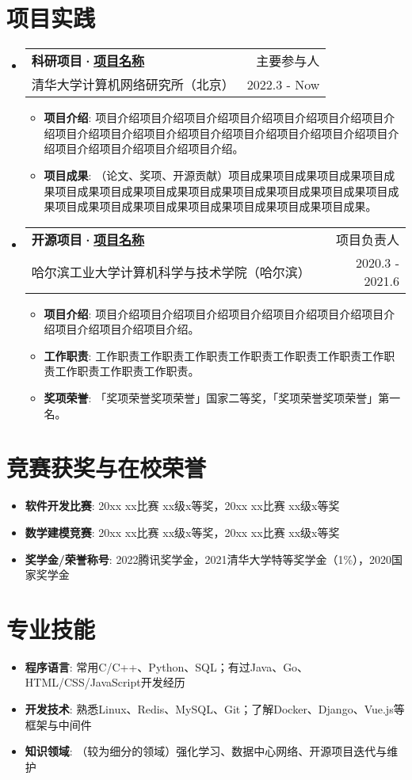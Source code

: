 \documentclass[letterpaper,11pt]{article}
\makeatletter
\newcommand{\resumeItem}[2]{
  \item\small{
    \textbf{#1}{: #2 \vspace{-2pt}}
  }
}
\newcommand{\resumeSubheading}[4]{
  \vspace{-1pt}\item
    \begin{tabular*}{0.97\textwidth}[t]{l@{\extracolsep{\fill}}r}
      \textbf{#1} & #2 \\
      {\small#3} & {\small #4} \\
    \end{tabular*}\vspace{-5pt}
}
\newcommand{\resumeSubItem}[2]{\resumeItem{#1}{#2}\vspace{-4pt}}
\newcommand{\resumeSubHeadingListStart}{\begin{itemize}[leftmargin=*]}
\newcommand{\resumeSubHeadingListEnd}{\end{itemize}}
\newcommand{\resumeItemListStart}{\begin{itemize}}
\newcommand{\resumeItemListEnd}{\end{itemize}\vspace{-5pt}}
\makeatother
\begin{document}
\section{项目实践}
  \resumeSubHeadingListStart
    \resumeSubheading
      {科研项目·\href{https://github.com/projectaddr}{项目名称}}{主要参与人}
      {清华大学计算机网络研究所（北京）}{2022.3 - Now}
      \resumeItemListStart
        \resumeItem{项目介绍}
          {项目介绍项目介绍项目介绍项目介绍项目介绍项目介绍项目介绍项目介绍项目介绍项目介绍项目介绍项目介绍项目介绍项目介绍项目介绍项目介绍项目介绍项目介绍项目介绍。}
        \resumeItem{项目成果}
          {（论文、奖项、开源贡献）项目成果项目成果项目成果项目成果项目成果项目成果项目成果项目成果项目成果项目成果项目成果项目成果项目成果项目成果项目成果项目成果项目成果项目成果项目成果。}
      \resumeItemListEnd
    \resumeSubheading
      {开源项目·\href{https://github.com/projectaddr}{项目名称}}{项目负责人}
      {哈尔滨工业大学计算机科学与技术学院（哈尔滨）}{2020.3 - 2021.6}
      \resumeItemListStart
        \resumeItem{项目介绍}
          {项目介绍项目介绍项目介绍项目介绍项目介绍项目介绍项目介绍项目介绍项目介绍项目介绍。}
        \resumeItem{工作职责}
          {工作职责工作职责工作职责工作职责工作职责工作职责工作职责工作职责工作职责工作职责。}
        \resumeItem{奖项荣誉}
          {「奖项荣誉奖项荣誉」国家二等奖，「奖项荣誉奖项荣誉」第一名。}
      \resumeItemListEnd
  \resumeSubHeadingListEnd


\section{竞赛获奖与在校荣誉}
  \resumeSubHeadingListStart
    \resumeSubItem{软件开发比赛}
      {20xx xx比赛 xx级x等奖，20xx xx比赛 xx级x等奖}
    \resumeSubItem{数学建模竞赛}
      {20xx xx比赛 xx级x等奖，20xx xx比赛 xx级x等奖}
    \resumeSubItem{奖学金/荣誉称号}
      {2022腾讯奖学金，2021清华大学特等奖学金（1\%），2020国家奖学金}
  \resumeSubHeadingListEnd


\section{专业技能}
  \resumeSubHeadingListStart
  \resumeSubItem{程序语言}{常用C/C++、Python、SQL；有过Java、Go、HTML/CSS/JavaScript开发经历}
  \resumeSubItem{开发技术}{熟悉Linux、Redis、MySQL、Git；了解Docker、Django、Vue.js等框架与中间件}
  \resumeSubItem{知识领域}{（较为细分的领域）强化学习、数据中心网络、开源项目迭代与维护}
  \resumeSubHeadingListEnd


\end{document}
